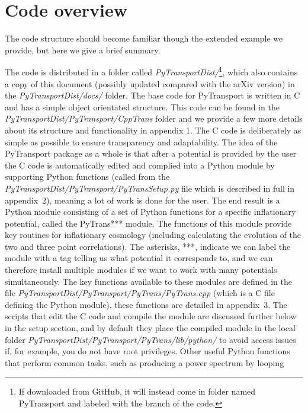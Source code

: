 \documentclass[10pt,
amsmath,amssymb,
aps,prd,nofootinbib,eqsecnum,a4paper]{revtex4}
\newcommand{\CC}{C\nolinebreak\hspace{-.05em}\raisebox{.4ex}{\tiny\bf +}\nolinebreak\hspace{-.10em}\raisebox{.4ex}{\tiny\bf +}}
\def\CC{{C\nolinebreak[4]\hspace{-.05em}\raisebox{.4ex}{\tiny\bf ++}}}
\def\S{ }
\begin{document}
\section{ Code overview} 

\noindent  The code structure should become familiar though the extended example we provide, but here we give a brief summary. 

The code is distributed in a folder called {\it PyTransportDist/}\footnote{If downloaded from GitHub, it will instead come in folder named PyTransport and labeled with the branch of the code.}, which also contains a copy of this document (possibly updated compared with the arXiv version) in the 
{\it PyTransportDist/docs/} folder. The base code for PyTransport is written in \CC \S  and has a simple object orientated structure. This code can be found 
in the {\it PyTransportDist/PyTransport/CppTrans} folder and we provide a few more details about its structure 
and functionality in  appendix 1. 
The \CC \S code is deliberately as simple as possible to ensure transparency 
and adaptability. The idea of the PyTransport package as a 
whole is that after a potential is provided by the user 
the \CC \S  code is automatically edited and complied into a Python module by supporting 
Python functions (called from the {\it PyTransportDist/PyTransport/PyTransSetup.py} file which is described in full 
in appendix~2), 
meaning a lot of work is done for the user.  
The end result is a Python module consisting of a set of Python functions for a specific inflationary potential, called the 
PyTrans*** module. 
The functions of this module provide key routines for inflationary cosmology (including calculating the evolution of the two and 
three point correlations). The asterisks, ***, indicate we can label the module with a tag telling us what potential it 
corresponds to, and we can 
therefore install multiple modules if we want to work with many potentials simultaneously. The 
key functions available to these modules 
are defined in the file {\it PyTransportDist/PyTransport/PyTrans/PyTrans.cpp} (which is a \CC \S  file defining the
 Python module), these functions are detailed in appendix~3.
The scripts  that edit the \CC \S code and compile the module are discussed further below in the setup section, 
and by default they place the compiled module in the local folder 
{\it PyTransportDist/PyTransport/PyTrans/lib/python/} to avoid access issues if, for example, you do not have root privileges. 
Other useful Python functions that perform common tasks, such as producing a power spectrum by looping 
\end{document}
